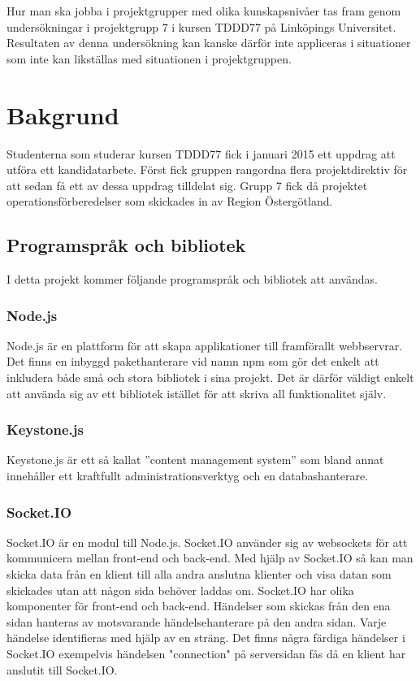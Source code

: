 \documentclass{article}
\begin{document}
Hur man ska jobba i projektgrupper med olika kunskapsnivåer tas fram genom undersökningar i projektgrupp 7 i kursen TDDD77 på Linköpings Universitet. Resultaten av denna undersökning kan kanske därför inte appliceras i situationer som inte kan likställas med situationen i projektgruppen.

\section{Bakgrund}
Studenterna som studerar kursen TDDD77 fick i januari 2015 ett uppdrag att utföra ett kandidatarbete. Först fick gruppen rangordna flera projektdirektiv för att sedan få ett av dessa uppdrag tilldelat sig. Grupp 7 fick då projektet operationsförberedelser som skickades in av Region Östergötland.

\subsection{Programspråk och bibliotek}
I detta projekt kommer följande programspråk och bibliotek att användas.

\subsubsection{Node.js}
Node.js är en plattform för att skapa applikationer till framförallt webbservrar. Det finns en inbyggd pakethanterare vid namn npm som gör det enkelt att inkludera både små och stora bibliotek i sina projekt. Det är därför väldigt enkelt att använda sig av ett bibliotek istället för att skriva all funktionalitet själv.

\subsubsection{Keystone.js}
Keystone.js är ett så kallat ''content management system'' som bland annat innehåller ett kraftfullt administrationsverktyg och en databashanterare.

\subsubsection{Socket.IO}
Socket.IO är en modul till Node.js. Socket.IO använder sig av websockets för att kommunicera mellan front-end och back-end. Med hjälp av Socket.IO så kan man skicka data från en klient till alla andra anslutna klienter och visa datan som skickades utan att någon sida behöver laddas om.
Socket.IO har olika komponenter för front-end och back-end. Händelser som skickas från den ena sidan hanteras av motsvarande händelsehanterare på den andra sidan. Varje händelse identifieras med hjälp av en sträng. Det finns några färdiga händelser i Socket.IO exempelvis händelsen "connection" på serversidan fås då en klient har anslutit till Socket.IO.
\end{document}
